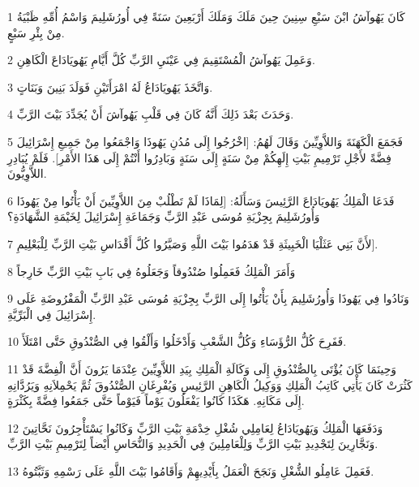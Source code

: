 \par 1 كَانَ يَهُوآشُ ابْنَ سَبْعِ سِنِينَ حِينَ مَلَكَ وَمَلَكَ أَرْبَعِينَ سَنَةً فِي أُورُشَلِيمَ وَاسْمُ أُمِّهِ ظَبْيَةُ مِنْ بِئْرِ سَبْعٍ.
\par 2 وَعَمِلَ يَهُوآشُ الْمُسْتَقِيمَ فِي عَيْنَيِ الرَّبِّ كُلَّ أَيَّامِ يَهُويَادَاعَ الْكَاهِنِ.
\par 3 وَاتَّخَذَ يَهُويَادَاعُ لَهُ امْرَأَتَيْنِ فَوَلَدَ بَنِينَ وَبَنَاتٍ.
\par 4 وَحَدَثَ بَعْدَ ذَلِكَ أَنَّهُ كَانَ فِي قَلْبِ يَهُوآشَ أَنْ يُجَدِّدَ بَيْتَ الرَّبِّ.
\par 5 فَجَمَعَ الْكَهَنَةَ وَاللاَّوِيِّينَ وَقَالَ لَهُمُ: [اخْرُجُوا إِلَى مُدُنِ يَهُوذَا وَاجْمَعُوا مِنْ جَمِيعِ إِسْرَائِيلَ فِضَّةً لأَجْلِ تَرْمِيمِ بَيْتِ إِلَهِكُمْ مِنْ سَنَةٍ إِلَى سَنَةٍ وَبَادِرُوا أَنْتُمْ إِلَى هَذَا الأَمْرِ]. فَلَمْ يُبَادِرِ اللاَّوِيُّونَ.
\par 6 فَدَعَا الْمَلِكُ يَهُويَادَاعَ الرَّئِيسَ وَسَأَلَهُ: [لِمَاذَا لَمْ تَطْلُبْ مِنَ اللاَّوِيِّينَ أَنْ يَأْتُوا مِنْ يَهُوذَا وَأُورُشَلِيمَ بِجِزْيَةِ مُوسَى عَبْدِ الرَّبِّ وَجَمَاعَةِ إِسْرَائِيلَ لِخَيْمَةِ الشَّهَادَةِ؟
\par 7 لأَنَّ بَنِي عَثَلْيَا الْخَبِيثَةِ قَدْ هَدَمُوا بَيْتَ اللَّهِ وَصَيَّرُوا كُلَّ أَقْدَاسِ بَيْتِ الرَّبِّ لِلْبَعْلِيمِ].
\par 8 وَأَمَرَ الْمَلِكُ فَعَمِلُوا صُنْدُوقاً وَجَعَلُوهُ فِي بَابِ بَيْتِ الرَّبِّ خَارِجاً
\par 9 وَنَادُوا فِي يَهُوذَا وَأُورُشَلِيمَ بِأَنْ يَأْتُوا إِلَى الرَّبِّ بِجِزْيَةِ مُوسَى عَبْدِ الرَّبِّ الْمَفْرُوضَةِ عَلَى إِسْرَائِيلَ فِي الْبَرِّيَّةِ.
\par 10 فَفَرِحَ كُلُّ الرُّؤَسَاءِ وَكُلُّ الشَّعْبِ وَأَدْخَلُوا وَأَلْقُوا فِي الصُّنْدُوقِ حَتَّى امْتَلَأَ.
\par 11 وَحِينَمَا كَانَ يُؤْتَى بِالصُّنْدُوقِ إِلَى وَكَالَةِ الْمَلِكِ بِيَدِ اللاَّوِيِّينَ عِنْدَمَا يَرُونَ أَنَّ الْفِضَّةَ قَدْ كَثُرَتْ كَانَ يَأْتِي كَاتِبُ الْمَلِكِ وَوَكِيلُ الْكَاهِنِ الرَّئِيسِ وَيُفْرِغَانِ الصُّنْدُوقَ ثُمَّ يَحْمِلاَنِهِ وَيَرُدَّانِهِ إِلَى مَكَانِهِ. هَكَذَا كَانُوا يَفْعَلُونَ يَوْماً فَيَوْماً حَتَّى جَمَعُوا فِضَّةً بِكَثْرَةٍ.
\par 12 وَدَفَعَهَا الْمَلِكُ وَيَهُويَادَاعُ لِعَامِلِي شُغْلِ خِدْمَةِ بَيْتِ الرَّبِّ وَكَانُوا يَسْتَأْجِرُونَ نَحَّاتِينَ وَنَجَّارِينَ لِتَجْدِيدِ بَيْتِ الرَّبِّ وَلِلْعَامِلِينَ فِي الْحَدِيدِ وَالنُّحَاسِ أَيْضاً لِتَرْمِيمِ بَيْتِ الرَّبِّ.
\par 13 فَعَمِلَ عَامِلُو الشُّغْلِ وَنَجَحَ الْعَمَلُ بِأَيْدِيهِمْ وَأَقَامُوا بَيْتَ اللَّهِ عَلَى رَسْمِهِ وَثَبَّتُوهُ.
